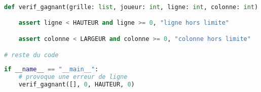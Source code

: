 \documentclass[svgnames,11pt]{beamer}
\begin{document}
\begin{frame}[fragile]
    \frametitle{}
    \begin{center}
        \begin{lstlisting}[language=Python , basicstyle=\ttfamily\small, xleftmargin=1em, xrightmargin=-1em]
def verif_gagnant(grille: list, joueur: int, ligne: int, colonne: int) -> bool:

    assert ligne < HAUTEUR and ligne >= 0, "ligne hors limite"

    assert colonne < LARGEUR and colonne >= 0, "colonne hors limite"

# reste du code
\end{lstlisting}
    \end{center}
    \begin{center}
        \begin{lstlisting}[language=Python , basicstyle=\ttfamily\small, xleftmargin=2em, xrightmargin=2em]
if __name__ == "__main__":
    # provoque une erreur de ligne
    verif_gagnant([], 0, HAUTEUR, 0)
\end{lstlisting}
        \label{CODE}
    \end{center}

\end{frame}
\end{document}
